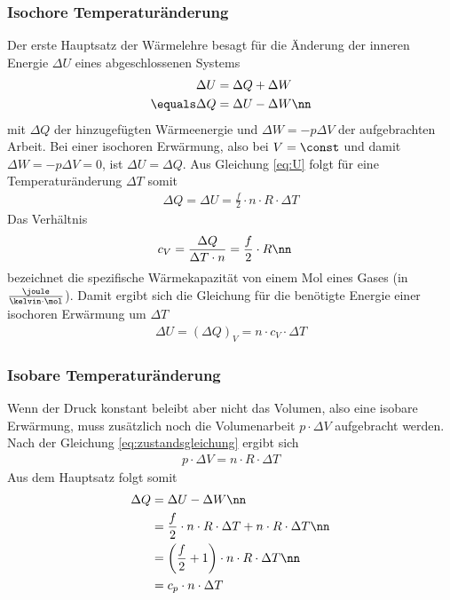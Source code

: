 \documentclass[12pt, a4paper, twoside]{scrartcl}
\begin{document}
\subsubsection*{Isochore Temperaturänderung}
Der erste Hauptsatz der Wärmelehre besagt für die Änderung der inneren Energie $\Delta U$ eines abgeschlossenen Systems
\begin{align}
 \Delta U &= \Delta Q + \Delta W \label{eq:HS} \\
\equals \Delta Q &= \Delta U - \Delta W \nn 
\end{align}
mit $\Delta Q$ der hinzugefügten Wärmeenergie und $\Delta W = -p \Delta V$ der aufgebrachten Arbeit.
Bei einer isochoren Erwärmung, also bei $V = \const$ und damit $\Delta W = -p \Delta V = 0$, ist $\Delta U = \Delta Q$.
Aus Gleichung \eqref{eq:U} folgt für eine Temperaturänderung $\Delta T$ somit
\begin{align}
 \Delta Q = \Delta U = \frac{f}{2}\cdot n \cdot R \cdot \Delta T
\end{align}
Das Verhältnis
\begin{align}
 c_V &= \frac{\Delta Q}{\Delta T \cdot n} = \frac{f}{2} \cdot R \nn
\end{align}
bezeichnet die spezifische Wärmekapazität von einem Mol eines Gases (in $\frac{\joule}{\kelvin\cdot\mol}$).
Damit ergibt sich die Gleichung für die benötigte Energie einer isochoren Erwärmung um $\Delta T$
\begin{align}
 \Delta U = \left(\Delta Q\right)_V = n\cdot c_V \cdot \Delta T \label{eq:dU_V}
\end{align}

\subsubsection*{Isobare Temperaturänderung}
Wenn der Druck konstant beleibt aber nicht das Volumen, also eine isobare Erwärmung, muss zusätzlich noch die Volumenarbeit $p \cdot\Delta V$ aufgebracht werden.
Nach der Gleichung \eqref{eq:zustandsgleichung} ergibt sich
\begin{align}
 p\cdot\Delta V = n\cdot R\cdot \Delta T
\end{align}
Aus dem Hauptsatz folgt somit
\begin{align}
 \Delta Q &= \Delta U - \Delta W \nn\\
          &= \frac{f}{2} \cdot n\cdot R\cdot \Delta T + n\cdot R\cdot \Delta T \nn\\
          &= \left(\frac{f}{2}+1\right) \cdot n\cdot R\cdot \Delta T \nn\\
          &= c_p \cdot n\cdot \Delta T
\end{align}
\end{document}
